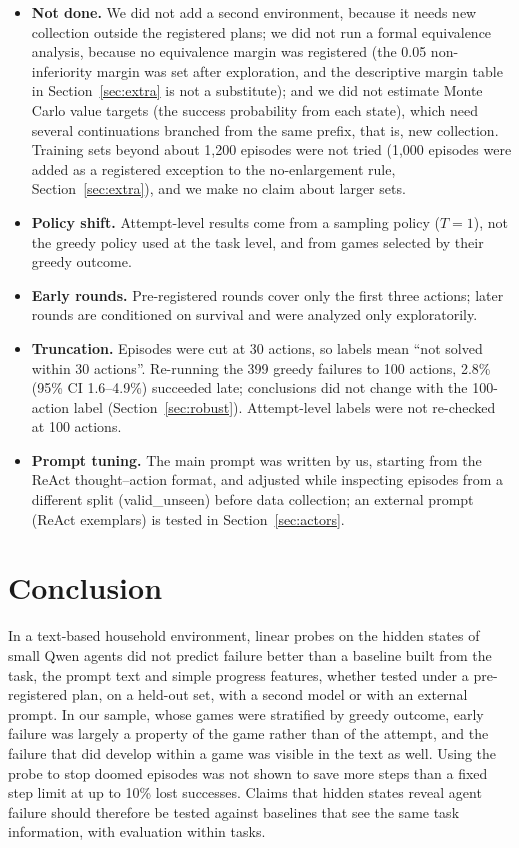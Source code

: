 \documentclass[11pt]{article}
\begin{document}
\begin{itemize}
\item \textbf{Not done.} We did not add a second environment, because it needs new collection outside the registered plans; we did not run a formal equivalence analysis, because no equivalence margin was registered (the 0.05 non-inferiority margin was set after exploration, and the descriptive margin table in Section~\ref{sec:extra} is not a substitute); and we did not estimate Monte Carlo value targets (the success probability from each state), which need several continuations branched from the same prefix, that is, new collection. Training sets beyond about 1,200 episodes were not tried (1,000 episodes were added as a registered exception to the no-enlargement rule, Section~\ref{sec:extra}), and we make no claim about larger sets.
\item \textbf{Policy shift.} Attempt-level results come from a sampling policy ($T = 1$), not the greedy policy used at the task level, and from games selected by their greedy outcome.
\item \textbf{Early rounds.} Pre-registered rounds cover only the first three actions; later rounds are conditioned on survival and were analyzed only exploratorily.
\item \textbf{Truncation.} Episodes were cut at 30 actions, so labels mean ``not solved within 30 actions''. Re-running the 399 greedy failures to 100 actions, 2.8\% (95\% CI 1.6--4.9\%) succeeded late; conclusions did not change with the 100-action label (Section~\ref{sec:robust}). Attempt-level labels were not re-checked at 100 actions.
\item \textbf{Prompt tuning.} The main prompt was written by us, starting from the ReAct thought--action format, and adjusted while inspecting episodes from a different split (valid\_unseen) before data collection; an external prompt (ReAct exemplars) is tested in Section~\ref{sec:actors}.
\end{itemize}

\section{Conclusion}
In a text-based household environment, linear probes on the hidden states of small Qwen agents did not predict failure better than a baseline built from the task, the prompt text and simple progress features, whether tested under a pre-registered plan, on a held-out set, with a second model or with an external prompt.
In our sample, whose games were stratified by greedy outcome, early failure was largely a property of the game rather than of the attempt, and the failure that did develop within a game was visible in the text as well.
Using the probe to stop doomed episodes was not shown to save more steps than a fixed step limit at up to 10\% lost successes.
Claims that hidden states reveal agent failure should therefore be tested against baselines that see the same task information, with evaluation within tasks.
\end{document}
